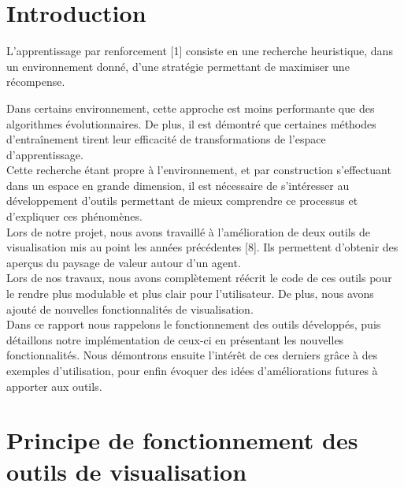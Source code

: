 \documentclass[12pt]{article}
\begin{document}
\newpage																		

\setlength{\parindent}{2ex}

\section*{Introduction}

L’apprentissage par renforcement [1] consiste en une recherche heuristique, dans un environnement donné, d’une stratégie permettant de maximiser une récompense. \par

Dans certains environnement, cette approche est moins performante que des algorithmes évolutionnaires. De plus, il est démontré que certaines méthodes d’entraînement tirent leur efficacité de transformations de l’espace d’apprentissage. \\

Cette recherche étant propre à l’environnement, et par construction s’effectuant dans un espace en grande dimension, il est nécessaire de s’intéresser au développement d’outils permettant de mieux comprendre ce processus et d’expliquer ces phénomènes. \\

Lors de notre projet, nous avons travaillé à l’amélioration de deux outils de visualisation mis au point les années précédentes [8]. Ils permettent d’obtenir des aperçus du paysage de valeur autour d’un agent. \\

Lors de nos travaux, nous avons complètement réécrit le code de ces outils pour le rendre plus modulable et plus clair pour l’utilisateur. De plus, nous avons ajouté de nouvelles fonctionnalités de visualisation. \\

Dans ce rapport nous rappelons le fonctionnement des outils développés, puis détaillons notre implémentation de ceux-ci en présentant les nouvelles fonctionnalités. Nous démontrons ensuite l'intérêt de ces derniers grâce à des exemples d'utilisation, pour enfin évoquer des idées d'améliorations futures à apporter aux outils. \\

\newpage

\renewcommand*\contentsname{Table des Matières}
\tableofcontents 

\newpage
\section{Principe de fonctionnement des outils de visualisation}
\end{document}

